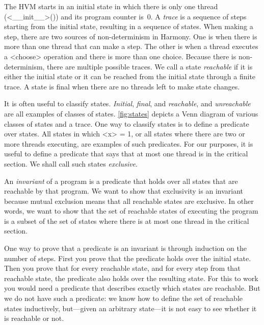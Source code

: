 \documentclass{report}
\begin{document}
%
%

The HVM starts in an initial state in which there is only
one thread (<{__init__}>()) and its program counter is~0.
A \emph{trace}
%
is a sequence of steps starting from the initial state,
resulting in a sequence of states.
When making a step, there are two sources of non-determinism
%
in Harmony.
One is when
there is more than one thread that can make a step.  The other is
when a thread executes a <{choose}> operation and there is
more than one choice.
Because there is non-determinism, there are multiple possible traces.
We call a state \emph{reachable}
%
if it is either the initial state
or it can be reached from the initial state through a finite trace.
A state is final
when there are no threads left to make state changes.

It is often useful to classify states.
\emph{Initial}, \emph{final}, and \emph{reachable}, and \emph{unreachable}
are all examples of classes of states.
\autoref{fig:states} depicts a Venn diagram of various classes of states
and a trace.
One way to classify states is to define a predicate over states.
All states in which <{x}> = 1, or all states where
there are two or more threads executing, are examples of such predicates.
For our purposes, it is useful to define a predicate that says that at
most one thread is in the critical section.  We shall call such states
\emph{exclusive}.

An \emph{invariant} of a program
%
is a predicate that holds over all states that are reachable by that program.
We want to show that exclusivity is an invariant because mutual exclusion means
that all reachable states are exclusive.
In other words, we want to show that the set of reachable states of executing
the program
is a subset of the set of states where there is at most one thread in the critical
section.

One way to prove that a predicate is an invariant is through induction
on the number of steps.  First you prove that the predicate holds over
the initial state.  Then you prove that for every reachable state,
and for every step from that reachable state, the predicate also holds
over the resulting state.
For this to work you would need a predicate that describes exactly which
states are reachable.
But we do not have such a predicate: we know how to define the set
of reachable states inductively, but---given an arbitrary state---it is not
easy to see whether it is reachable or not.
\end{document}
